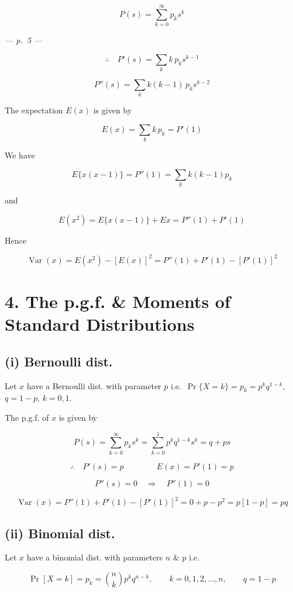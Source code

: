 \documentclass[
]{article}
\begin{document}
\[P(s) = \sum_{k=0}^{\infty} p_k s^k\]

\emph{--- p.~5 ---}

\[\therefore \quad P'(s) = \sum_k k\, p_k s^{k-1}\]

\[P''(s) = \sum_k k(k-1)\, p_k s^{k-2}\]

The expectation \(E(x)\) is given by

\[E(x) = \sum_k k\, p_k = P'(1)\]

We have

\[E\{x(x-1)\} = P''(1) = \sum_k k(k-1) p_k\]

and

\[E(x^2) = E\{x(x-1)\} + Ex = P''(1) + P'(1)\]

Hence

\[\operatorname{Var}(x) = E(x^2) - \left[E(x)\right]^2 = P''(1) + P'(1) - \left[P'(1)\right]^2\]

\section{4. The p.g.f. \& Moments of Standard
Distributions}\label{the-p.g.f.-moments-of-standard-distributions}

\subsection{(i) Bernoulli dist.}\label{i-bernoulli-dist.}

Let \(x\) have a Bernoulli dist. with parameter \(p\)
i.e.~\(\Pr\{X = k\} = p_k = p^k q^{1-k}\), \(q = 1-p\), \(k = 0, 1\).

The p.g.f. of \(x\) is given by

\[P(s) = \sum_{k=0}^{\infty} p_k s^k = \sum_{k=0}^{1} p^k q^{1-k} s^k = q + ps\]

\[\therefore \quad P'(s) = p \qquad\qquad E(x) = P'(1) = p\]

\[P''(s) = 0 \quad \Rightarrow \quad P''(1) = 0\]

\[\operatorname{Var}(x) = P''(1) + P'(1) - \left[P'(1)\right]^2 = 0 + p - p^2 = p\left[1-p\right] = pq\]

\subsection{(ii) Binomial dist.}\label{ii-binomial-dist.}

Let \(x\) have a binomial dist. with parameters \(n\) \& \(p\) i.e.

\[\Pr[X = k] = p_k = \binom{n}{k} p^k q^{n-k}, \qquad k = 0, 1, 2, \ldots, n, \qquad q = 1-p\]
\end{document}
